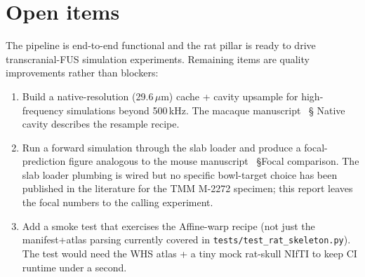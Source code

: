 \documentclass{compactarticle}
\begin{document}
\section{Open items}
\label{sec:open}

The pipeline is end-to-end functional and the rat pillar is ready
to drive transcranial-FUS simulation experiments. Remaining items
are quality improvements rather than blockers:

\begin{enumerate}[leftmargin=*]
\setlength\itemsep{0pt}
  \item Build a native-resolution (29.6\,$\mu$m) cache + cavity
        upsample for high-frequency simulations beyond
        500\,kHz. The macaque manuscript~\cite{tuba-macaque} \S
        Native cavity describes the resample recipe.
  \item Run a forward simulation through the slab loader and produce
        a focal-prediction figure analogous to the mouse
        manuscript~\cite{tuba-mouse} \S Focal comparison. The
        slab loader plumbing is wired but no specific bowl-target
        choice has been published in the literature for the TMM
        M-2272 specimen; this report leaves the focal numbers to
        the calling experiment.
  \item Add a smoke test that exercises the Affine-warp recipe (not
        just the manifest+atlas parsing currently covered in
        \texttt{tests/test\_rat\_skeleton.py}). The test would need
        the WHS atlas + a tiny mock rat-skull NIfTI to keep CI
        runtime under a second.
\end{enumerate}
\end{document}

